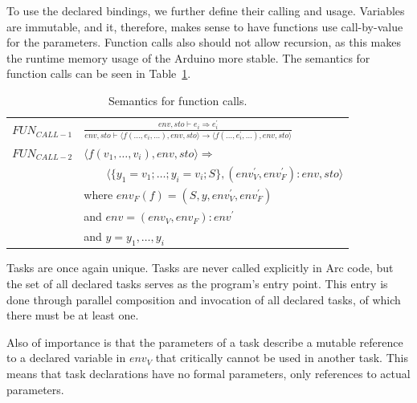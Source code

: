 To use the declared bindings, we further define their calling and usage. Variables are immutable, and it, therefore, makes sense to have functions use call-by-value for the parameters. Function calls also should not allow recursion, as this makes the runtime memory usage of the Arduino more stable. The semantics for function calls can be seen in Table~\ref{tab:functioncalls}.


\begin{table}[htb!]
    \centering
    \begin{tabular}{ll}
        \toprule
        $FUN_{CALL-1}$ & $\frac
            {env, sto \vdash e_i \Rightarrow e^\prime_i}
            {env, sto \vdash \langle f(\dots, e_i, \dots), env,sto \rangle \rightarrow \langle f(\dots, e^\prime_i, \dots), env, sto \rangle}$ \\ [12pt]
        $FUN_{CALL-2}$ & $\langle f(v_1,\dots,v_i), env, sto \rangle \Rightarrow$                                                              \\
                       & $\qquad \langle \{y_1 = v_1;\dots;y_i = v_i; S\}, (env^\prime_V, env^\prime_F):env, sto \rangle$                      \\ [12pt]

                       & where $env_F(f) = (S, y, env^\prime_V, env^\prime_F)$                                                                 \\
                       & and $env = (env_V, env_F) : env^\prime $                                                                              \\
                       & and $y = y_1,\dots,y_i$                                                                                               \\
        \bottomrule
    \end{tabular}
    \caption{Semantics for function calls.}
    \label{tab:functioncalls}
\end{table}


Tasks are once again unique. Tasks are never called explicitly in Arc code, but the set of all declared tasks serves as the program's entry point. This entry is done through parallel composition and invocation of all declared tasks, of which there must be at least one.

Also of importance is that the parameters of a task describe a mutable reference to a declared variable in $env_V$ that critically cannot be used in another task. This means that task declarations have no formal parameters, only references to actual parameters.

